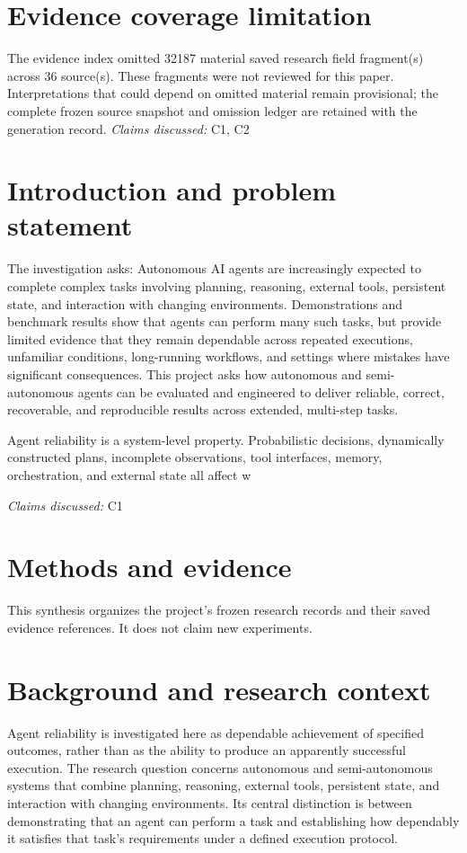 \documentclass[11pt]{article}
\begin{document}
\section*{Evidence coverage limitation}
The evidence index omitted 32187 material saved research field fragment(s) across 36 source(s). These fragments were not reviewed for this paper. Interpretations that could depend on omitted material remain provisional; the complete frozen source snapshot and omission ledger are retained with the generation record.
\textit{Claims discussed: }C1, C2
\section{Introduction and problem statement}
The investigation asks: Autonomous AI agents are increasingly expected to complete complex tasks involving planning, reasoning, external tools, persistent state, and interaction with changing environments. Demonstrations and benchmark results show that agents can perform many such tasks, but provide limited evidence that they remain dependable across repeated executions, unfamiliar conditions, long-running workflows, and settings where mistakes have significant consequences. This project asks how autonomous and semi-autonomous agents can be evaluated and engineered to deliver reliable, correct, recoverable, and reproducible results across extended, multi-step tasks.

Agent reliability is a system-level property. Probabilistic decisions, dynamically constructed plans, incomplete observations, tool interfaces, memory, orchestration, and external state all affect w

\textit{Claims discussed: }C1
\section{Methods and evidence}
This synthesis organizes the project's frozen research records and their saved evidence references. It does not claim new experiments.

\section{Background and research context}
Agent reliability is investigated here as dependable achievement of specified outcomes, rather than as the ability to produce an apparently successful execution. The research question concerns autonomous and semi-autonomous systems that combine planning, reasoning, external tools, persistent state, and interaction with changing environments. Its central distinction is between demonstrating that an agent can perform a task and establishing how dependably it satisfies that task\textquoteright{}s requirements under a defined execution protocol.
\end{document}
